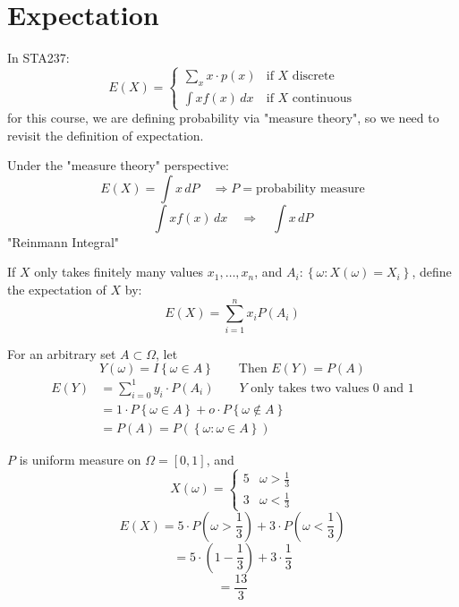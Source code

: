 \section{Expectation}
\newlecture[][Sep 22, 2026]

In STA237:
\[E(X) = \begin{cases*}
    \sum_{x}^{}x\cdot p(x) &\text{if } X \text{ discrete}\\
    \int xf(x)\,dx &\text{if } X \text{ continuous}
\end{cases*}\]
for this course, we are defining probability via "measure theory", so we need to revisit the definition of expectation.

Under the "measure theory" perspective:
\[E(X) = \int x\, dP \quad \Rightarrow P = \text{probability measure}\]
\[\int xf(x)\,dx \quad \Rightarrow \quad \int x\, dP\]
"Reinmann Integral"

\begin{definition}
    If $X$ only takes finitely many values $x_1, \dots, x_n$, and $A_i : \left\{\omega: X(\omega) = X_i\right\}$, define the expectation of $X$ by:
    \[E(X) = \sum_{i=1}^{n}x_i P(A_i)\]
\end{definition}

\begin{example}[][5.1.1]
    For an arbitrary set $A \subset \Omega$, let
    \[Y(\omega) = I\left\{\omega \in A\right\} \qquad \text{Then } E(Y) = P(A)\]
    \begin{align*}
        E(Y) &= \sum_{i=0}^{1}y_i \cdot P(A_i) \qquad Y\text{ only takes two values 0 and 1}\\
        &= 1 \cdot P\left\{\omega \in A\right\} + o\cdot P\left\{\omega \notin A\right\}\\
        &= P(A) = P(\left\{\omega: \omega \in A\right\})
    \end{align*}
\end{example}


\begin{example}[][5.1.2]
    $P$ is uniform measure on $\Omega = [0,1]$, and 
    \[X(\omega) = \begin{cases}
        5 & \omega > \frac{1}{3} \\
        3 & \omega < \frac{1}{3}
    \end{cases}\]
    \[E(X) = 5 \cdot P(\omega > \frac{1}{3}) + 3\cdot P(\omega < \frac{1}{3})\]
    \[=5\cdot (1-\frac{1}{3}) + 3\cdot \frac{1}{3}\]
    \[ = \frac{13}{3}\]
\end{example}

